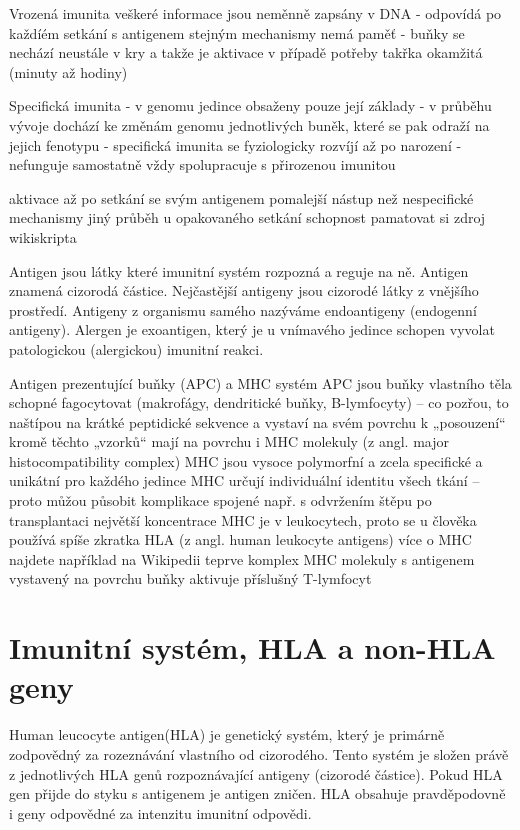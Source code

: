 \documentclass[czech,DP]{thesiskiv}
\begin{document}
Vrozená imunita veškeré informace jsou neměnně zapsány v DNA 
- odpovídá po každíém setkání s antigenem stejným mechanismy nemá paměť
- buňky se nechází neustále v kry a takže je aktivace v případě potřeby takřka okamžitá (minuty až hodiny)

Specifická imunita
- v genomu jedince obsaženy pouze její základy
- v průběhu vývoje dochází ke změnám genomu jednotlivých buněk, které se pak odraží na jejich fenotypu
- specifická imunita se fyziologicky rozvíjí až po narození
- nefunguje samostatně vždy spolupracuje s přirozenou imunitou

aktivace až po setkání se svým antigenem
pomalejší nástup než nespecifické mechanismy
jiný průběh u opakovaného setkání
schopnost pamatovat si
zdroj wikiskripta

Antigen jsou látky které imunitní systém rozpozná a reguje na ně. Antigen znamená cizorodá částice. Nejčastější antigeny jsou cizorodé látky z vnějšího prostředí.
Antigeny z organismu samého nazýváme endoantigeny (endogenní antigeny). Alergen je exoantigen, který je u vnímavého jedince schopen vyvolat patologickou (alergickou) imunitní reakci.

Antigen prezentující buňky (APC) a MHC systém
APC jsou buňky vlastního těla schopné fagocytovat (makrofágy, dendritické buňky, B-lymfocyty) – co pozřou, to naštípou na krátké peptidické sekvence a vystaví na svém povrchu k „posouzení“
kromě těchto „vzorků“ mají na povrchu i MHC molekuly (z angl. major histocompatibility complex)
MHC jsou vysoce polymorfní a zcela specifické a unikátní pro každého jedince
MHC určují individuální identitu všech tkání – proto můžou působit komplikace spojené např. s odvržením štěpu po transplantaci
největší koncentrace MHC je v leukocytech, proto se u člověka používá spíše zkratka HLA (z angl. human leukocyte antigens)
více o MHC najdete například na Wikipedii
teprve komplex MHC molekuly s antigenem vystavený na povrchu buňky aktivuje příslušný T-lymfocyt
\section{Imunitní systém, HLA a non-HLA geny}

Human leucocyte antigen(HLA) je genetický systém, který je primárně zodpovědný za rozeznávání vlastního od cizorodého. Tento systém je složen právě z jednotlivých HLA genů rozpoznávající antigeny (cizorodé částice). Pokud HLA gen přijde do styku s antigenem je antigen zničen.
HLA obsahuje pravděpodovně i geny odpovědné za intenzitu imunitní odpovědi.
\end{document}
